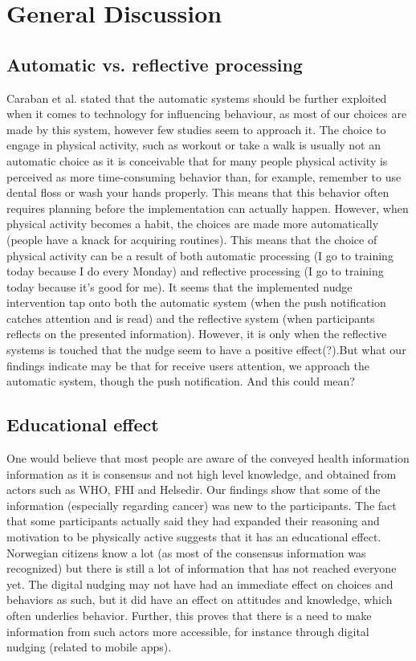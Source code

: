 \section{General Discussion}

\subsection{Automatic vs. reflective processing}
Caraban et al. \cite{caraban_23_2019} stated that the automatic systems should be further exploited when it comes to technology for influencing behaviour, as most of our choices are made by this system, however few studies seem to approach it. The choice to engage in physical activity, such as workout or take a walk is usually not an automatic choice as it is conceivable that for many people physical activity is perceived as more time-consuming behavior than, for example, remember to use dental floss or wash your hands properly. This means that this behavior often requires planning before the implementation can actually happen. However, when physical activity becomes a habit, the choices are made more automatically (people have a knack for acquiring routines). This means that the choice of physical activity can be a result of both automatic processing (I go to training today because I do every Monday) and reflective processing (I go to training today because it's good for me). It seems that the implemented nudge intervention tap onto both the automatic system (when the push notification catches attention and is read) and the reflective system (when participants reflects on the presented information). However, it is only when the reflective systems is touched that the nudge seem to have a positive effect(?).But what our findings indicate may be that for receive users attention, we approach the automatic system, though the push notification. And this could mean?

\subsection{Educational effect}
One would believe that most people are aware of the conveyed health information information as it is consensus and not high level knowledge, and obtained from actors such as WHO, FHI and Helsedir. Our findings show that some of the information (especially regarding cancer) was new to the participants. The fact that some participants actually said they had expanded their reasoning and motivation to be physically active suggests that it has an educational effect. Norwegian citizens know a lot (as most of the consensus information was recognized) but there is still a lot of information that has not reached everyone yet. The digital nudging may not have had an immediate effect on choices and behaviors as such, but it did have an effect on attitudes and knowledge, which often underlies behavior. Further, this proves that there is a need to make information from such actors more accessible, for instance through digital nudging (related to mobile apps). 

